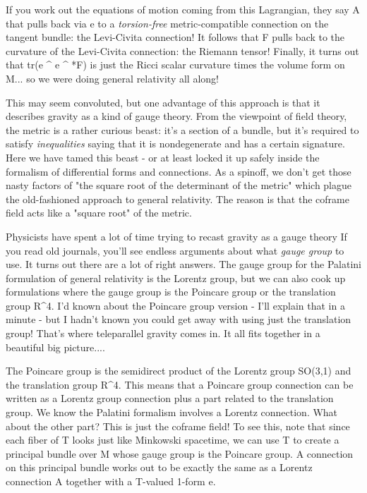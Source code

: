 If you work out the equations of motion coming from this Lagrangian, 
they say A that pulls back via e to a \emph{torsion-free} metric-compatible 
connection on the tangent bundle: the Levi-Civita connection!  It
follows that F pulls back to the curvature of the Levi-Civita
connection: the Riemann tensor!   Finally, it turns out that 
tr(e ^ e ^ *F) is just the Ricci scalar curvature times the volume 
form on M... so we were doing general relativity all along!  

This may seem convoluted, but one advantage of this approach is that it
describes gravity as a kind of gauge theory.  From the viewpoint of
field theory, the metric is a rather curious beast: it's a section of a
bundle, but it's required to satisfy \emph{inequalities} saying that it is
nondegenerate and has a certain signature.  Here we have tamed this
beast - or at least locked it up safely inside the formalism of
differential forms and connections.  As a spinoff, we don't get those
nasty factors of "the square root of the determinant of the metric"
which plague the old-fashioned approach to general relativity.  The
reason is that the coframe field acts like a "square root" of the
metric.

Physicists have spent a lot of time trying to recast gravity as a gauge
theory  If you read old journals, you'll see endless arguments about
what \emph{gauge group} to use.   It turns out there are a lot of right
answers.   The gauge group for the Palatini formulation of general
relativity is the Lorentz group, but we can also cook up formulations
where the gauge group is the Poincare group or the translation group
R^{4}.  I'd known about the Poincare group version - I'll explain that in
a minute - but I hadn't known you could get away with using just the
translation group!  That's where teleparallel gravity comes in.  It all
fits together in a beautiful big picture....

The Poincare group is the semidirect product of the Lorentz group
SO(3,1) and the translation 
group R^{4}.  This means that a Poincare group
connection can be written as a Lorentz group connection plus a part
related to the translation group.  We know the Palatini formalism
involves a Lorentz connection.  What about the other part?   This is
just the coframe field!   To see this, note that since each fiber of T
looks just like Minkowski spacetime, we can use T to create a principal
bundle over M whose gauge group is the Poincare group.  A connection on
this principal bundle works out to be exactly the same as a Lorentz
connection A together with a T-valued 1-form e.  

